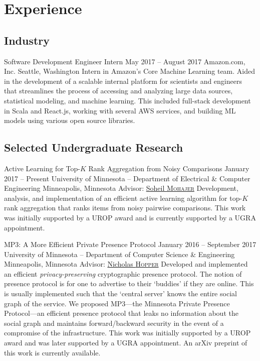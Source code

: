 \section{Experience}
\subsection{Industry}
\block
  {Software Development Engineer Intern}
  {May 2017 -- August 2017}
  {Amazon.com, Inc.}
  {Seattle, Washington}
  {}
  {
    Intern in Amazon's Core Machine Learning team. Aided in the development
    of a scalable internal platform for scientists and engineers that
    streamlines the process of accessing and analyzing large data sources,
    statistical modeling, and machine learning. This included full-stack
    development in Scala and React.js, working with several AWS services, and
    building ML models using various open source libraries.
  }

\subsection{Selected Undergraduate Research}
\block
  {Active Learning for Top-\boldmath$K$ Rank Aggregation from Noisy Comparisons}
  {January 2017 -- Present}
  {University of Minnesota -- Department of Electrical \& Computer Engineering}
  {Minneapolis, Minnesota}
  {Advisor: \href{\soheil}{Soheil \textsc{Mohajer}}}
  {
    Development, analysis, and implementation of an efficient active learning
    algorithm for top-$K$ rank aggregation that ranks items from noisy pairwise
    comparisons.  This work was initially supported by a UROP award and is
    currently supported by a UGRA appointment.
  }

\block
  {MP3: A More Efficient Private Presence Protocol}
  {January 2016 -- September 2017}
  {University of Minnesota -- Department of Computer Science \& Engineering}
  {Minneapolis, Minnesota}
  {Advisor: \href{\hoppernj}{Nicholas \textsc{Hopper}}}
  {
    Developed and implemented an efficient \emph{privacy-preserving}
    cryptographic presence protocol. The notion of presence protocol is for one
    to advertise to their `buddies' if they are online. This is usually
    implemented such that the `central server' knows the entire social graph of
    the service. We proposed MP3---the Minnesota Private Presence Protocol---an
    efficient presence protocol that leaks no information about the social graph
    and maintains forward/backward security in the event of a compromise of the
    infrastructure.  This work was initially supported by a UROP award and was
    later supported by a UGRA appointment. An arXiv preprint of this work is
    currently available.
  }

